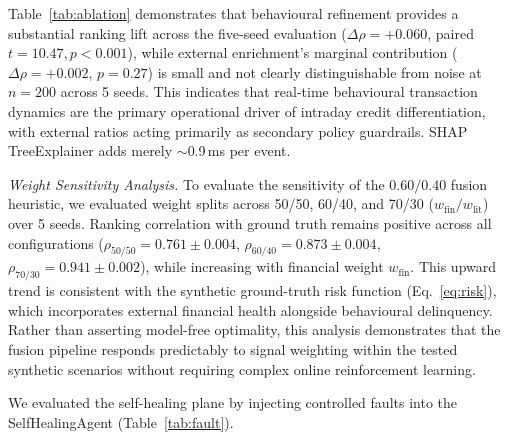 \documentclass[conference]{IEEEtran}
\begin{document}
Table~\ref{tab:ablation} demonstrates that behavioural refinement provides a substantial ranking lift across the five-seed evaluation ($\Delta\rho=+0.060$, paired $t=10.47, p<0.001$), while external enrichment's marginal contribution ($\Delta\rho=+0.002$, $p=0.27$) is small and not clearly distinguishable from noise at $n=200$ across 5 seeds. This indicates that real-time behavioural transaction dynamics are the primary operational driver of intraday credit differentiation, with external ratios acting primarily as secondary policy guardrails. SHAP TreeExplainer adds merely $\sim$0.9\,ms per event.

\noindent\textit{Weight Sensitivity Analysis.} To evaluate the sensitivity of the $0.60/0.40$ fusion heuristic, we evaluated weight splits across 50/50, 60/40, and 70/30 ($w_{\text{fin}}/w_{\text{lit}}$) over 5 seeds. Ranking correlation with ground truth remains positive across all configurations ($\rho_{50/50}=0.761\pm0.004$, $\rho_{60/40}=0.873\pm0.004$, $\rho_{70/30}=0.941\pm0.002$), while increasing with financial weight $w_{\text{fin}}$. This upward trend is consistent with the synthetic ground-truth risk function (Eq.~\ref{eq:risk}), which incorporates external financial health alongside behavioural delinquency. Rather than asserting model-free optimality, this analysis demonstrates that the fusion pipeline responds predictably to signal weighting within the tested synthetic scenarios without requiring complex online reinforcement learning.

We evaluated the self-healing plane by injecting controlled faults into the SelfHealingAgent (Table~\ref{tab:fault}).

\begin{table}[htbp]
\caption{Fault injection results (mocked Kafka, single-node decision latency).}
\label{tab:fault}
\centering\scriptsize
{}
\end{table}
\end{document}
